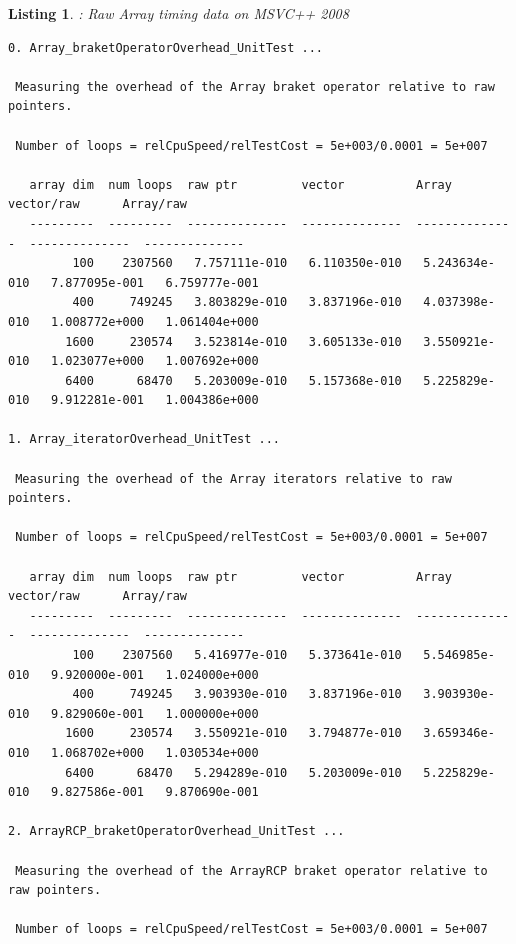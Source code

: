 \documentclass[pdf,ps2pdf,11pt]{SANDreport}
\newtheorem{listing}{Listing}
\begin{document}
\begin{listing}: Raw Array timing data on MSVC++ 2008  \\
\label{listing:Array-MSVC-Timings}
{\scriptsize\begin{verbatim}
0. Array_braketOperatorOverhead_UnitTest ... 
 
 Measuring the overhead of the Array braket operator relative to raw pointers.
 
 Number of loops = relCpuSpeed/relTestCost = 5e+003/0.0001 = 5e+007
 
   array dim  num loops  raw ptr         vector          Array           vector/raw      Array/raw     
   ---------  ---------  --------------  --------------  --------------  --------------  --------------
         100    2307560   7.757111e-010   6.110350e-010   5.243634e-010   7.877095e-001   6.759777e-001
         400     749245   3.803829e-010   3.837196e-010   4.037398e-010   1.008772e+000   1.061404e+000
        1600     230574   3.523814e-010   3.605133e-010   3.550921e-010   1.023077e+000   1.007692e+000
        6400      68470   5.203009e-010   5.157368e-010   5.225829e-010   9.912281e-001   1.004386e+000

1. Array_iteratorOverhead_UnitTest ... 
 
 Measuring the overhead of the Array iterators relative to raw pointers.
 
 Number of loops = relCpuSpeed/relTestCost = 5e+003/0.0001 = 5e+007
 
   array dim  num loops  raw ptr         vector          Array           vector/raw      Array/raw     
   ---------  ---------  --------------  --------------  --------------  --------------  --------------
         100    2307560   5.416977e-010   5.373641e-010   5.546985e-010   9.920000e-001   1.024000e+000
         400     749245   3.903930e-010   3.837196e-010   3.903930e-010   9.829060e-001   1.000000e+000
        1600     230574   3.550921e-010   3.794877e-010   3.659346e-010   1.068702e+000   1.030534e+000
        6400      68470   5.294289e-010   5.203009e-010   5.225829e-010   9.827586e-001   9.870690e-001

2. ArrayRCP_braketOperatorOverhead_UnitTest ... 
 
 Measuring the overhead of the ArrayRCP braket operator relative to raw pointers.
 
 Number of loops = relCpuSpeed/relTestCost = 5e+003/0.0001 = 5e+007
 

\end{verbatim}}
\end{listing}
\end{document}

